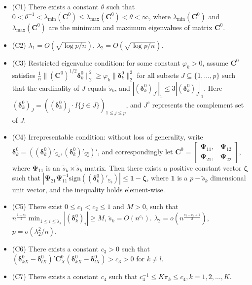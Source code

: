\documentclass[12pt]{article}
\begin{document}
\begin{itemize}
\item(C1)  There exists a constant $\theta$ such that $0 < \theta^{-1} < \lambda_{\min}(\bm C^0) \leq \lambda_{\max}(\bm C^0) < \theta < \infty$,
where $\lambda_{\min}(\bm C^0)$ and $\lambda_{\max}(\bm C^0)$ are the minimum and maximum
eigenvalues of matrix $\bm C^0$.

\item(C2) $\lambda_1 = O(\sqrt{\log p / n})$, $\lambda_2 = O(\sqrt{\log p / n})$.

\item(C3) Restricted eigenvalue condition: for some constant $\varphi_k > 0$, assume $\bm C^0$ satisfies
$\frac{1}{n}\| (\bm C^0)^{1/2} \bm \delta_k^0 \|_2^2 \geq \varphi_k \| \bm \delta_k^0 \|_2^2$ for all subsets $J \subseteq \{1,\ldots,p\}$ such that the cardinality of $J$ equals $\tilde{s}_k$, and $| (\bm \delta_k^0)_{J^c} |_1 \leq 3| (\bm \delta_k^0)_{J} |_1$.
Here $(\bm \delta_k^0)_{J} = ((\bm \delta_k^0)_j \cdot I\{j \in J\})_{1\leq j \leq p}$, and $J^c$ represents the complement set of $J$.

\item(C4) Irrepresentable condition: without loss of generality,
write $\bm \delta_k^0 = ((\bm \delta_k^0)'_{\mathbb{S}_{\delta}},
(\bm \delta_k^0)'_{\mathbb{S}_{\delta}^c})'$,
and correspondingly let $\bm C^0 = \left[
\begin{array}{cc}
\bm \Psi_{11}, & \bm\Psi_{12} \\
\bm \Psi_{21}, & \bm\Psi_{22}
\end{array}\right]$,
where $\bm \Psi_{11}$ is an $\tilde{s}_k \times \tilde{s}_k$ matrix.
Then there exists a positive constant vector $\bm \zeta$ such that
$| \bm \Psi_{21} \bm \Psi_{11}^{-1} \mbox{sign}((\bm \delta_k^0)'_{\mathbb{S}_{\delta}}) | \leq \bm 1 - \bm \zeta$,
where $\bm 1$ is a $p - \tilde{s}_k$ dimensional unit vector,
and the inequality holds element-wise.

\item(C5) There exist $0 \leq c_1 < c_2 \leq 1$ and $M > 0$, such that
$n^{\frac{1-c_2}{2}} \min_{1 \leq i \leq \tilde{s}_k}| (\bm \delta_k^0)_i| \geq M$, $\tilde{s}_k = O(n^{c_1})$. $\lambda_2 = o(n^{\frac{c_2-c_1+1}{2}})$,
$p = o(\lambda_2^2 / n)$.

\item(C6)  There exists a constant $c_3 > 0$ such that $(\bm \delta_{kX}^0 - \bm \delta_{lX}^0)' \bm C_X^0 (\bm \delta_{kX}^0 - \bm \delta_{lX}^0) > c_3 > 0$ for $k \neq l$.

\item(C7)  There exists a constant $c_4$ such that
$c_4^{-1} \leq K \pi_k \leq c_4, k = 1, 2, \ldots, K$.
\end{itemize}
\end{document}
